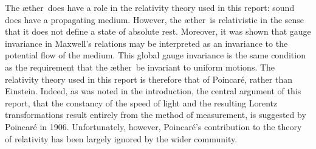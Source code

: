 \documentclass[10pt, fleqn,final,showtrims,oldfontcommands, article,a4paper,oneside]{memoir} %
\newcommand{\aether}{\ae ther}
\newcommand{\Poincare}{Poincar{\'e}\xspace}
\begin{document}



The \aether\ does have a role in the relativity theory used in this report:
sound does have a propagating medium.
However, the \aether\ is relativistic in the sense that it does not define a state of absolute rest. 
%
Moreover, it was shown that gauge invariance in Maxwell's relations may be interpreted as an invariance to the  potential flow of the medium.
This global gauge invariance is the same condition as the requirement that the \aether\ be invariant to uniform motions.
The relativity theory used in this report is therefore that of \Poincare, rather than Einstein.
Indeed, as was noted in the introduction,
the central argument of this report,
that the constancy of the speed of light and the resulting Lorentz transformations
result entirely from the method of measurement, 
is suggested by \Poincare in 1906\cite{Poincare1906}.
Unfortunately, however, \Poincare's contribution to the theory of relativity has been largely ignored by the wider community.
\end{document}
